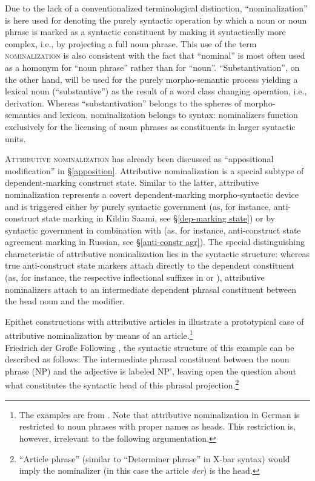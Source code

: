 Due to the lack of a conventionalized terminological distinction, “nominalization” is here used for denoting the purely syntactic operation by which a noun or noun phrase is marked as a syntactic constituent by making it syntactically more complex, i.e., by projecting a full noun phrase. This use of the term \textsc{nominalization} is also consistent with the fact that “nominal” is most often used as a homonym for “noun phrase” rather than for “noun”. “Substantivation”, on the other hand, will be used for the purely morpho-semantic process yielding a lexical noun (“substantive”) as the result of a word class changing operation, i.e., derivation. Whereas “substantivation” belongs to the spheres of morpho-semantics and lexicon, nominalization belongs to syntax: nominalizers function exclusively for the licensing of noun phrases as constituents in larger syntactic units.

\textsc{Attributive nominalization} has already been discussed as “appositional modification” in \S\ref{apposition}. Attributive nominalization is a special subtype of dependent\hyp{}marking construct state. Similar to the latter, attributive nominalization represents a covert dependent\hyp{}marking morpho-syntactic device and is triggered either by purely syntactic government (as, for instance, anti\hyp{}construct state marking in Kildin Saami, see \S\ref{dep-marking state}) or by syntactic government in combination with  (as, for instance, anti\hyp{}construct state agreement marking in Russian, see \S\ref{anti-constr agr}). The special distinguishing characteristic of attributive nominalization lies in the syntactic structure: whereas true anti\hyp{}construct state markers attach directly to the dependent constituent (as, for instance, the respective inflectional suffixes in  or ), attributive nominalizers attach to an intermediate dependent phrasal constituent between the head noun and the modifier.

Epithet constructions with attributive articles in  illustrate a prototypical case of attributive nominalization by means of an article.\footnote{The examples are from \citet[179–180]{himmelmann1997}. Note that attributive nominalization in German is restricted to noun phrases with proper names as heads. This restriction is, however, irrelevant to the following argumentation.}
\ea
\label{german epithet}
\\
Friedrich der Große 			
\z
Following \citet[180]{himmelmann1997}, the syntactic structure of this example can be described as follows:
\z
The intermediate phrasal constituent between the noun phrase (NP) and the adjective is labeled NP', leaving open the question about what constitutes the syntactic head of this phrasal projection.\footnote{“Article phrase” (similar to “Determiner phrase” in X-bar syntax) would imply the nominalizer (in this case the article \textit{der}) is the head.}

